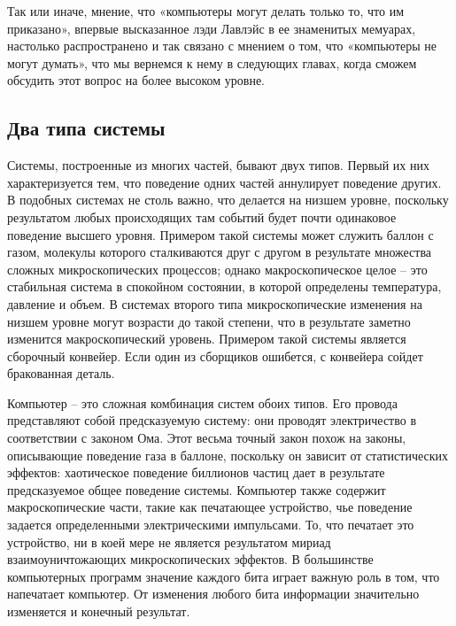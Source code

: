 \documentclass[../main.tex]{subfiles}
\begin{document}
Так или иначе, мнение, что «компьютеры могут делать только то, что им приказано», впервые высказанное лэди Лавлэйс в ее знаменитых мемуарах, настолько распространено и так связано с мнением о том, что «компьютеры не могут думать», что мы вернемся к нему в следующих главах, когда сможем обсудить этот вопрос на более высоком уровне.


\subsection{Два типа системы}

Системы, построенные из многих частей, бывают двух типов. Первый их них характеризуется тем, что поведение одних частей аннулирует поведение других. В подобных системах не столь важно, что делается на низшем уровне, поскольку результатом любых происходящих там событий будет почти одинаковое поведение высшего уровня. Примером такой системы может служить баллон с газом, молекулы которого сталкиваются друг с другом в результате множества сложных микроскопических процессов; однако макроскопическое целое \--- это стабильная система в спокойном состоянии, в которой определены температура, давление и объем. В системах второго типа микроскопические изменения на низшем уровне могут возрасти до такой степени, что в результате заметно изменится макроскопический уровень. Примером такой системы является сборочный конвейер. Если один из сборщиков ошибется, с конвейера сойдет бракованная деталь.

Компьютер \--- это сложная комбинация систем обоих типов. Его провода представляют собой предсказуемую систему: они проводят электричество в соответствии с законом Ома. Этот весьма точный закон похож на законы, описывающие поведение газа в баллоне, поскольку он зависит от статистических эффектов: хаотическое поведение биллионов частиц дает в результате предсказуемое общее поведение системы. Компьютер также содержит макроскопические части, такие как печатающее устройство, чье поведение задается определенными электрическими импульсами. То, что печатает это устройство, ни в коей мере не является результатом мириад взаимоуничтожающих микроскопических эффектов. В большинстве компьютерных программ значение каждого бита играет важную роль в том, что напечатает компьютер. От изменения любого бита информации значительно изменяется и конечный результат.
\end{document}
